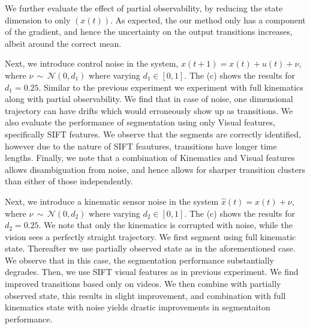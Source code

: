 We further evaluate the effect of partial observability, by reducing the state dimension to only $(x(t))$. As expected, the our method only has a component of the gradient, and hence the uncertainty on the output transitions increases, albeit around the correct mean. 

Next, we introduce control noise in the system, $x(t+1) = x(t)+u(t)+\nu$, where $\nu\, \sim\, \mathcal{N}(0, d_1)$ where varying $d_1\in[0,1]$. The  (c) shows the results for $d_1=0.25$. Similar to the previous experiment we experiment with full kinematics along with partial observability. We find that in case of noise, one dimensional trajectory can have drifts which would erroneously show up as transitions. 
We also evaluate the performance of segmentation using only Visual features, specifically SIFT features. We observe that the segments are correctly identified, however due to the nature of SIFT feautures, transitions have longer time lengths.
Finally, we note that a combination of Kinematics and Visual features allows disambiguation from noise, and hence allows for sharper transition clusters than either of those independently. 

Next, we introduce a kinematic sensor noise in the system $\hat{x}(t)= x(t)+\nu$, where $\nu\, \sim\, \mathcal{N}(0, d_2)$ where varying $d_2\in[0,1]$. The  (c) shows the results for $d_2=0.25$. We note that only the kinematics is corrupted with noise, while the vision sees a perfectly straight trajectory. We first segment using full kinematic state. Thereafter we use partially observed state as in the aforementioned case. We observe that in this case, the segmentation performance substantially degrades. Then, we use SIFT visual features as in previous experiment. We find improved transitions based only on videos. We then combine with partially observed state, this results in slight improvement, and combination with full kinematics state with noise yields drastic improvements in segmentaiton performance. 


